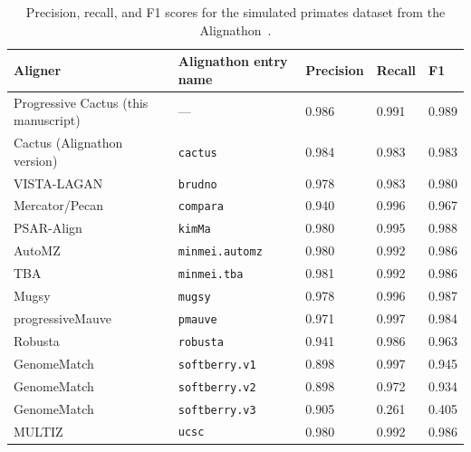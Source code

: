 \documentclass{article}
\begin{document}
\begin{table}
\begin{center}
\begin{tabular}{l|l|l|l|l}
Aligner	& Alignathon entry name & Precision	& Recall	& F1 \\
\midrule
Progressive Cactus (this manuscript)	& --- & 0.986	& 0.991	& 0.989 \\
Cactus (Alignathon version)	& \texttt{cactus} & 0.984	& 0.983	& 0.983 \\
VISTA-LAGAN~\cite{vistaLagan} & \texttt{brudno}	& 0.978	& 0.983	& 0.980 \\
Mercator/Pecan~\cite{mercator,pecan} & \texttt{compara}	& 0.940 &	0.996 &	0.967 \\
PSAR-Align~\cite{psarAlign} & \texttt{kimMa}	& 0.980	& 0.995	& 0.988 \\
AutoMZ~\cite{tba} & \texttt{minmei.automz}	& 0.980	& 0.992	& 0.986 \\
TBA~\cite{tba} & \texttt{minmei.tba}	& 0.981	& 0.992	& 0.986 \\
Mugsy~\cite{mugsy} & \texttt{mugsy}	& 0.978	& 0.996	& 0.987 \\
progressiveMauve~\cite{progressiveMauve} & \texttt{pmauve} & 0.971 & 0.997 &	0.984 \\
Robusta~\cite{robusta} & \texttt{robusta}	& 0.941	& 0.986	& 0.963 \\
GenomeMatch & \texttt{softberry.v1}	& 0.898	& 0.997	& 0.945 \\
GenomeMatch & \texttt{softberry.v2}	& 0.898	& 0.972	& 0.934 \\
GenomeMatch & \texttt{softberry.v3}	& 0.905	& 0.261	& 0.405 \\
MULTIZ~\cite{tba} & \texttt{ucsc}	& 0.980	& 0.992	& 0.986 \\
\end{tabular}
\caption{Precision, recall, and F1 scores for the simulated primates dataset from the Alignathon~\cite{earl2014alignathon}.}\label{tab:alignathonPrimates}
\end{center}
\end{table}
\end{document}
